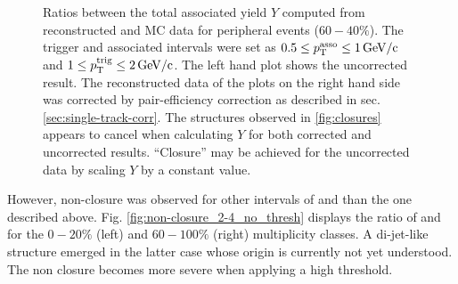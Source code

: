 \begin{figure}[htbp]
\begin{subfigure}[b]{0.5\textwidth}
  \end{subfigure}
  \caption[Ratios between the total associated yield $Y$ computed from reconstructed and MC data for peripheral events ($60-40\%$).]{Ratios between the total associated yield $Y$ computed from reconstructed and MC data for peripheral events ($60-40\%$). The trigger and associated intervals were set as $0.5 \le p_{\text{T}}^{\text{asso}} \le \SI{1}{GeV/c}$ and $1 \le p_{\text{T}}^{\text{trig}} \le \SI{2}{GeV/c}$. The left hand plot shows the uncorrected result. The reconstructed data of the plots on the right hand side was corrected by pair-efficiency correction as described in sec. \ref{sec:single-track-corr}. The \dphi structures observed in \ref{fig:closures} appears to cancel when calculating $Y$ for both corrected and uncorrected results. ``Closure'' may be achieved for the uncorrected data by scaling $Y$ by a constant value.}
  \label{fig:closure_Y}
\end{figure}

However, non-closure was observed for other intervals of \ptassoc and \pttrig than the one described above. Fig. \ref{fig:non-closure_2-4_no_thresh} displays the ratio of \Yrecon and \Ytruth for the  $0-20\%$ (left) and $60-100\%$ (right) multiplicity classes. A di-jet-like structure emerged in the latter case whose origin is currently not yet understood. The non closure becomes more severe when applying a high \pt threshold.

